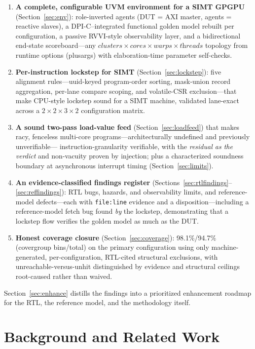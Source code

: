 \documentclass[conference]{IEEEtran}
\newcommand{\code}[1]{\texttt{\small #1}}
\begin{document}
\begin{enumerate}
\item \textbf{A complete, configurable UVM environment for a SIMT
GPGPU} (Section~\ref{sec:env}): role-inverted agents (DUT = AXI master,
agents = reactive slaves), a DPI-C--integrated functional golden model
rebuilt per configuration, a passive RVVI-style observability layer,
and a bidirectional end-state scoreboard---any
$\textit{clusters}\times\textit{cores}\times\textit{warps}\times\textit{threads}$
topology from runtime options (plusargs) with elaboration-time
parameter self-checks.
\item \textbf{Per-instruction lockstep for SIMT}
(Section~\ref{sec:lockstep}): five alignment rules---uuid-keyed
program-order sorting, mask-union record aggregation, per-lane
compare scoping, and volatile-CSR exclusion---that make CPU-style
lockstep sound for a SIMT machine, validated lane-exact across a
$2\times2\times3\times2$ configuration matrix.
\item \textbf{A sound two-pass load-value feed}
(Section~\ref{sec:loadfeed}) that makes racy, fenceless multi-core
programs---architecturally undefined and previously unverifiable---%
instruction-granularity verifiable, with the \emph{residual as the
verdict} and non-vacuity proven by injection; plus a characterized
soundness boundary at asynchronous interrupt timing
(Section~\ref{sec:limits}).
\item \textbf{An evidence-classified findings register}
(Sections~\ref{sec:rtlfindings}--\ref{sec:reffindings}): RTL bugs,
hazards, and observability limits, and reference-model defects---each
with \code{file:line} evidence and a disposition---including a
reference-model fetch bug found \emph{by} the lockstep, demonstrating
that a lockstep flow verifies the golden model as much as the DUT.
\item \textbf{Honest coverage closure} (Section~\ref{sec:coverage}):
98.1\%/94.7\% (covergroup bins/total) on the primary configuration using only
machine-generated, per-configuration, RTL-cited structural exclusions,
with unreachable-versus-unhit distinguished by evidence and structural
ceilings root-caused rather than waived.
\end{enumerate}

Section~\ref{sec:enhance} distills the findings into a prioritized
enhancement roadmap for the RTL, the reference model, and the
methodology itself.

\section{Background and Related Work}
\label{sec:background}
\end{document}
